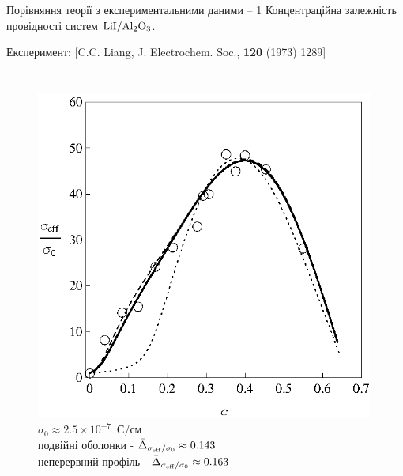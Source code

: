 \documentclass[10pt]{beamer}
\begin{document}
\begin{frame}{Порівняння теорії з експериментальними даними -- 1}
Концентраційна залежність провідності систем $\rm LiI/Al_2O_3$.
\vspace{-5pt}

\scriptsize{Експеримент: [C.C. Liang, J. Electrochem. Soc., {\bf 120} (1973) 1289]}
\vspace{-10pt}

\footnotesize
\begin{columns}[T,onlytextwidth]
      \begin{figure}
        \centering
        \includegraphics[width=0.99\textwidth]{images/Fig12_Liang_LiI-Al2O3-Processing.eps}
        $\sigma_0 \approx 2.5 \times 10^{-7}$~С/см\\
        подвійні оболонки - $\bar{\Delta}_{\sigma_{\rm eff}/\sigma_0} \approx 0.143$\\
        неперервний профіль - $\bar{\Delta}_{\sigma_{\rm eff}/\sigma_0} \approx 0.163$
      \end{figure}


\end{columns}
\end{frame}
\end{document}
